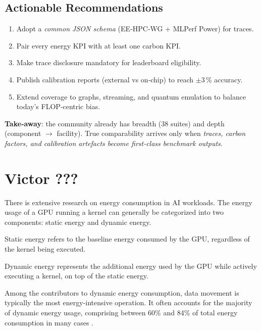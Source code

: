 \subsection{Actionable Recommendations}


\begin{enumerate}
  \item Adopt a \emph{common JSON schema} (EE‑HPC‑WG + MLPerf Power) for traces.
  \item Pair every energy KPI with at least one carbon KPI.
  \item Make trace disclosure mandatory for leaderboard eligibility.
  \item Publish calibration reports (external vs on‑chip) to reach
        $\pm$3\,\% accuracy.
  \item Extend coverage to graphs, streaming, and quantum emulation
        to balance today’s FLOP‑centric bias.
\end{enumerate}

\textbf{Take‑away}: the community already has breadth (38 suites) and depth
(component $\rightarrow$ facility).  True comparability arrives only when
\emph{traces, carbon factors, and calibration artefacts become first‑class
benchmark outputs}.


\section{Victor ???}




There is extensive research on energy consumption in AI workloads. The energy usage of a GPU running a kernel can generally be categorized into two components: static energy and dynamic energy.

Static energy refers to the baseline energy consumed by the GPU, regardless of the kernel being executed.

Dynamic energy represents the additional energy used by the GPU while actively executing a kernel, on top of the static energy.

Among the contributors to dynamic energy consumption, data movement is typically the most energy-intensive operation. It often accounts for the majority of dynamic energy usage, comprising between 60\% and 84\% of total energy consumption in many cases \cite{delestrac2024analyzing}.

